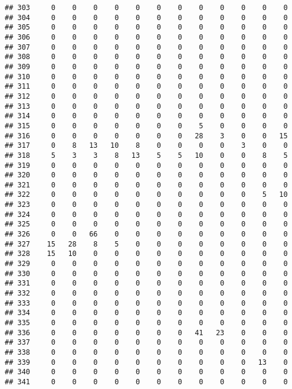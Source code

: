 \documentclass[]{article}
\begin{document}
\begin{verbatim}
## 303     0    0    0    0    0    0    0    0    0    0    0    0
## 304     0    0    0    0    0    0    0    0    0    0    0    0
## 305     0    0    0    0    0    0    0    0    0    0    0    0
## 306     0    0    0    0    0    0    0    0    0    0    0    0
## 307     0    0    0    0    0    0    0    0    0    0    0    0
## 308     0    0    0    0    0    0    0    0    0    0    0    0
## 309     0    0    0    0    0    0    0    0    0    0    0    0
## 310     0    0    0    0    0    0    0    0    0    0    0    0
## 311     0    0    0    0    0    0    0    0    0    0    0    0
## 312     0    0    0    0    0    0    0    0    0    0    0    0
## 313     0    0    0    0    0    0    0    0    0    0    0    0
## 314     0    0    0    0    0    0    0    0    0    0    0    0
## 315     0    0    0    0    0    0    0    5    0    0    0    0
## 316     0    0    0    0    0    0    0   28    3    0    0   15
## 317     0    8   13   10    8    0    0    0    0    3    0    0
## 318     5    3    3    8   13    5    5   10    0    0    8    5
## 319     0    0    0    0    0    0    0    0    0    0    0    0
## 320     0    0    0    0    0    0    0    0    0    0    0    0
## 321     0    0    0    0    0    0    0    0    0    0    0    0
## 322     0    0    0    0    0    0    0    0    0    0    5   10
## 323     0    0    0    0    0    0    0    0    0    0    0    0
## 324     0    0    0    0    0    0    0    0    0    0    0    0
## 325     0    0    0    0    0    0    0    0    0    0    0    0
## 326     0    0   66    0    0    0    0    0    0    0    0    0
## 327    15   28    8    5    0    0    0    0    0    0    0    0
## 328    15   10    0    0    0    0    0    0    0    0    0    0
## 329     0    0    0    0    0    0    0    0    0    0    0    0
## 330     0    0    0    0    0    0    0    0    0    0    0    0
## 331     0    0    0    0    0    0    0    0    0    0    0    0
## 332     0    0    0    0    0    0    0    0    0    0    0    0
## 333     0    0    0    0    0    0    0    0    0    0    0    0
## 334     0    0    0    0    0    0    0    0    0    0    0    0
## 335     0    0    0    0    0    0    0    0    0    0    0    0
## 336     0    0    0    0    0    0    0   41   23    0    0    0
## 337     0    0    0    0    0    0    0    0    0    0    0    0
## 338     0    0    0    0    0    0    0    0    0    0    0    0
## 339     0    0    0    0    0    0    0    0    0    0   13    0
## 340     0    0    0    0    0    0    0    0    0    0    0    0
## 341     0    0    0    0    0    0    0    0    0    0    0    0

\end{verbatim}
\end{document}
